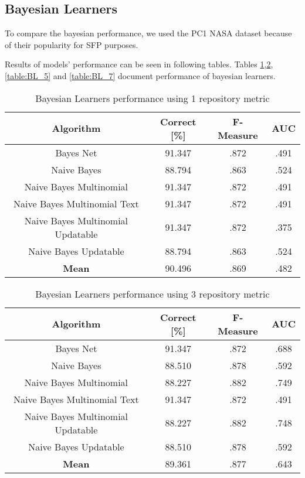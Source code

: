 \subsection{Bayesian Learners}
To compare the bayesian performance, we used the PC1 NASA dataset because of their popularity for SFP purposes.

Results of models' performance can be seen in following tables. Tables \ref{table:BL_1},\ref{table:BL_3}, \ref{table:BL_5} and \ref{table:BL_7} document performance of bayesian learners.				


\begin{table}[h!]		
\centering		
\begin{tabular}{ |c|c|c|c| } 		
 \hline		
 \textbf{Algorithm} & \textbf{Correct [\%]} & \textbf{F-Measure} & \textbf{AUC}  \\ 		
 \hline		
 Bayes Net & 91.347 & .872 & .491    \\ 		
 \hline		
 Naive Bayes &  88.794 & .863 & .524   \\ 		
 \hline		
  Naive Bayes Multinomial & 91.347 & .872 & .491\\ 		
 \hline		
  Naive Bayes Multinomial Text & 91.347 & .872 & .491  \\ 		
 \hline		
  Naive Bayes Multinomial Updatable & 91.347 & .872 & .375 \\ 		
 \hline		
  Naive Bayes Updatable & 88.794 & .863 & .524 \\ 		
 \hline	
 \textbf{Mean}  & 90.496 & .869 & .482 \\ 		
 \hline
		
\end{tabular}		
\caption{Bayesian Learners performance using 1 repository metric}		
\label{table:BL_1}		
\end{table}

\begin{table}[h!]		
\centering		
\begin{tabular}{ |c|c|c|c| } 		
 \hline		
 \textbf{Algorithm} & \textbf{Correct [\%]} & \textbf{F-Measure} & \textbf{AUC}  \\ 		
 \hline		
 Bayes Net & 91.347 & .872 & .688    \\ 		
 \hline		
 Naive Bayes &  88.510 & .878 & .592   \\ 		
 \hline		
  Naive Bayes Multinomial & 88.227 & .882 & .749\\ 		
 \hline		
  Naive Bayes Multinomial Text & 91.347 & .872 & .491  \\ 		
 \hline		
  Naive Bayes Multinomial Updatable & 88.227 & .882 & .748 \\ 		
 \hline		
  Naive Bayes Updatable & 88.510 & .878 & .592 \\ 		
 \hline	
 \textbf{Mean}  & 89.361 & .877 & .643 \\ 		
 \hline
		
\end{tabular}		
\caption{Bayesian Learners performance using 3 repository metric}		
\label{table:BL_3}		
\end{table}

